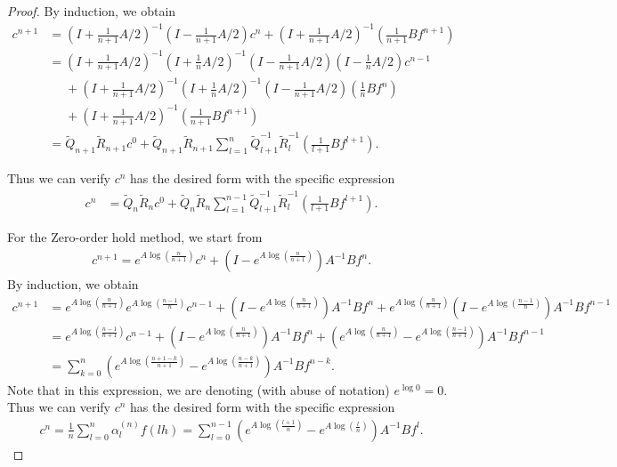 \documentclass{article}
\theoremstyle{definition}
\newcommand{\pr}[1]{ \left( #1 \right) }
\begin{document}
\begin{proof}
By induction, we obtain
\begin{equation*}
    \begin{aligned}
    c^{n+1} 
    &= \pr{ I + \frac{1}{n+1}A/2 }^{-1} \pr{ I - \frac{1}{n+1} A/2 } c^n + \pr{ I + \frac{1}{n+1}A/2 }^{-1} \pr{\frac{1}{n+1}Bf^{n+1} }\\
    &= \pr{ I + \frac{1}{n+1}A/2 }^{-1} \pr{ I + \frac{1}{n}A/2 }^{-1} \pr{ I - \frac{1}{n+1}A/2 } \pr{ I - \frac{1}{n}A/2 } c^{n-1}\\
    &\phantom{=}+ \pr{ I + \frac{1}{n+1}A/2 }^{-1} \pr{ I + \frac{1}{n}A/2 }^{-1}\pr{ I - \frac{1}{n+1}A/2 } \pr{\frac{1}{n}Bf^{n} }\\
    &\phantom{=}+ \pr{ I + \frac{1}{n+1}A/2 }^{-1} \pr{\frac{1}{n+1}Bf^{n+1} }\\
    &= \tilde{Q}_{n+1} \tilde{R}_{n+1} c^0 + 
    \tilde{Q}_{n+1} \tilde{R}_{n+1} \sum_{l=1}^{n} \tilde{Q}_{l+1}^{-1} \tilde{R}_l^{-1} \pr{\frac{1}{l+1}Bf^{l+1}}.
    \end{aligned}
\end{equation*}

Thus we can verify $c^n$ has the desired form with the specific expression
\begin{equation} \label{eq:apbil_numsol}
    \begin{aligned}
    c^n &=
    \tilde{Q}_{n}\tilde{R}_{n}c^0 + \tilde{Q}_{n}\tilde{R}_{n} \sum_{l=1}^{n-1} \tilde{Q}_{l+1}^{-1} \tilde{R}_l^{-1} \pr{\frac{1}{l+1}Bf^{l+1}}.
    \end{aligned}
\end{equation}

For the Zero-order hold method, we start from
\begin{align*}
    c^{n+1} = e^{A\log\pr{\frac{n}{n+1}}}c^n + \pr{I - e^{A \log \pr{\frac{n}{n+1}}}} A^{-1} B f^n.
\end{align*}
By induction, we obtain
\begin{align*}
    c^{n+1} &= e^{A\log\pr{\frac{n}{n+1}}} e^{A\log\pr{\frac{n-1}{n}}}c^{n-1} 
    + \pr{I-e^{A\log\pr{\frac{n}{n+1}}}} A^{-1}Bf^n
    + e^{A\log\pr{\frac{n}{n+1}}} \pr{I - e^{A\log\pr{\frac{n-1}{n}}}} A^{-1}Bf^{n-1} \\
    &= e^{A\log\pr{\frac{n-1}{n+1}}}c^{n-1}
    + \pr{I-e^{A\log\pr{\frac{n}{n+1}}}} A^{-1}Bf^n
    +  \pr{e^{A\log\pr{\frac{n}{n+1}}} - e^{A\log\pr{\frac{n-1}{n+1}}}} A^{-1}Bf^{n-1} \\
    &= \sum_{k=0}^{n} \pr{e^{A\log\pr{\frac{n+1-k}{n+1}}} - e^{A\log\pr{\frac{n-k}{n+1}}}}A^{-1}Bf^{n-k}.
\end{align*}
Note that in this expression, we are denoting (with abuse of notation) $e^{\log{0}}=0$.
Thus we can verify $c^n$ has the desired form with the specific expression
\begin{align} \label{eq:zoh_numsol}
    c^n = \frac{1}{n} \sum_{l=0}^n \alpha^{(n)}_l f(lh) = \sum_{l=0}^{n-1} \pr{e^{A\log\pr{\frac{l+1}{n}}} - e^{A\log\pr{\frac{l}{n}}}} A^{-1}B f^l.
\end{align}
\end{proof}
\end{document}
